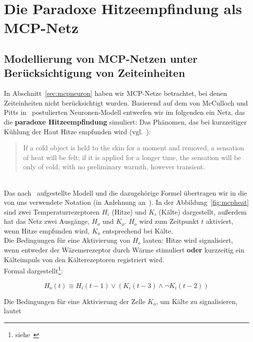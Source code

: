 \chapter{Die Paradoxe Hitzeempfindung als MCP-Netz}\label{appendix:paradoxehitzeempfindung}
\section*{Modellierung von MCP-Netzen unter Berücksichtigung von Zeiteinheiten}

In Abschnitt~\ref{sec:mcpneuron} haben wir MCP-Netze betrachtet, bei denen Zeiteinheiten nicht berücksichtigt wurden.
Basierend auf dem von McCulloch und Pitts in~\cite{MP43} postulierten Neuronen-Modell entwerfen wir im folgenden ein Netz, das die \textbf{paradoxe Hitzeempfindung} simuliert: Das Phänomen, das bei kurzzeitiger Kühlung der Haut Hitze empfunden wird (vgl.~\cite{HVKJ82}):\\

\blockquote[{\cite[106]{MP43}}]{
    If a cold object is held to the skin for a moment and removed, a sensation of heat will be felt; if it is applied for a longer time, the sensation will be only of cold, with no preliminary warmth, however transient.
}\\

Das nach~\cite[105, Figure 1 (e)]{MP43} aufgestellte Modell und die dazugehörige Formel übertragen wir in die von uns verwendete Notation (in Anlehnung an~\cite[31 f.]{Fau94}). In der Abbildung~\ref{fig:mcpheat} sind zwei Temperaturrezeptoren $H_i$ (Hitze) und $K_i$ (Kälte) dargestellt, außerdem hat das Netz zwei Ausgänge, $H_o$ und $K_o$. $H_o$ wird zum Zeitpunkt $t$ aktiviert, wenn Hitze empfunden wird, $K_o$ entsprechend bei Kälte.\\

Die Bedingungen für eine Aktivierung von $H_o$ lauten: Hitze wird signalisiert, wenn entweder der Wäremerezeptor durch Wärme stimuliert \textbf{oder} kurzzeitig ein Kälteimpuls von den Kälterezeptoren registriert wird.\\

Formal dargestellt\footnote{
    siehe~\cite[106]{MP43}
}:

\begin{equation}
    H_o(t) \equiv H_i(t-1) \lor (K_i(t-3) \land \neg K_i(t - 2))
    \label{eq:gl-heat}
\end{equation}

Die Bedingungen für eine Aktivierung der Zelle $K_o$, um Kälte zu signalisieren, lautet


